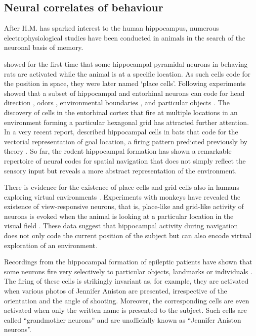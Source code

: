     
  \subsection{Neural correlates of behaviour} 
    After H.M. has sparked interest to the human hippocampus, numerous
    electrophysiological studies have been conducted in animals in the
    search of the neuronal basis of memory.

    \cite{OKeefe1971} showed for the first time that some hippocampal pyramidal
    neurons in behaving rats are activated while the animal is at a specific
    location. As such cells code for the position in space, they were later
    named `place cells'. Following experiments showed that a subset of
    hippocampal and entorhinal neurons can code for head direction
    \citep{Taube1990a, Taube1990b}, odors \citep{Wood1999}, environmental
    boundaries \citep{Jeffery2006}, and particular objects \citep{Manns2009}. The
    discovery of cells in the entorhinal cortex that fire at multiple locations
    in an environment forming a particular hexagonal grid \citep{Hafting2005}
    has attracted further attention. In a very recent report, \cite{Sarel2017}
    described hippocampal cells in bats that code for the vectorial
    representation of goal location, a firing pattern predicted previously by
    theory \citep{Stemmler2015}. So far, the rodent hippocampal formation has
    shown a remarkable repertoire of neural codes for spatial navigation that
    does not simply reflect the sensory input but reveals a more abstract
    representation of the environment.
  
    There is evidence for the existence of place cells and grid cells also in
    humans exploring virtual environments \citep{Ekstrom2003, Jacobs2013}.
    Experiments with monkeys have revealed the existence of view-responsive
    neurons, that is, place-like and grid-like activity of neurons is evoked
    when the animal is looking at a particular location in the visual field
    \citep{Rolls1995, Killian2012}. These data suggest that hippocampal
    activity during navigation does not only code the current position of the
    subject but can also encode virtual exploration of an environment.
    
    Recordings from the hippocampal formation of epileptic patients have shown
    that some neurons fire very selectively to particular objects, landmarks or
    individuals \citep{Quiroga2005}. The firing of these cells is strikingly
    invariant as, for example, they are activated when various photos of
    Jennifer Aniston are presented, irrespective of the orientation and the
    angle of shooting. Moreover, the corresponding cells are even activated
    when only the written name is presented to the subject. Such cells are
    called ``grandmother neurons'' and are unofficially known as ``Jennifer
    Aniston neurons''.

